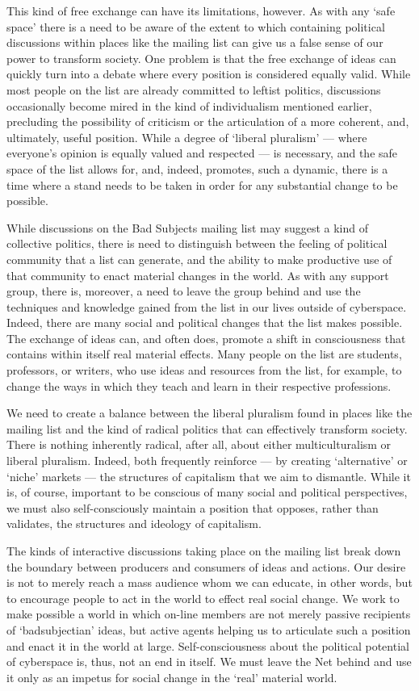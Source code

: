 \documentclass[letterpaper,12pt,english]{sphinxmanual}
\begin{document}
This kind of free exchange can have its limitations, however. As with any `safe space' there is a need to be aware of the extent to which containing political discussions within places like the mailing list can give us a false sense of our power to transform society. One problem is that the free exchange of ideas can quickly turn into a debate where every position is considered equally valid. While most people on the list are already committed to leftist politics, discussions occasionally become mired in the kind of individualism mentioned earlier, precluding the possibility of criticism or the articulation of a more coherent, and, ultimately, useful position. While a degree of `liberal pluralism' — where everyone's opinion is equally valued and respected — is necessary, and the safe space of the list allows for, and, indeed, promotes, such a dynamic, there is a time where a stand needs to be taken in order for any substantial change to be possible.

While discussions on the Bad Subjects mailing list may suggest a kind of collective politics, there is need to distinguish between the feeling of political community that a list can generate, and the ability to make productive use of that community to enact material changes in the world. As with any support group, there is, moreover, a need to leave the group behind and use the techniques and knowledge gained from the list in our lives outside of cyberspace. Indeed, there are many social and political changes that the list makes possible. The exchange of ideas can, and often does, promote a shift in consciousness that contains within itself real material effects. Many people on the list are students, professors, or writers, who use ideas and resources from the list, for example, to change the ways in which they teach and learn in their respective professions.

We need to create a balance between the liberal pluralism found in places like the mailing list and the kind of radical politics that can effectively transform society. There is nothing inherently radical, after all, about either multiculturalism or liberal pluralism. Indeed, both frequently reinforce — by creating `alternative' or `niche' markets — the structures of capitalism that we aim to dismantle. While it is, of course, important to be conscious of many social and political perspectives, we must also self-consciously maintain a position that opposes, rather than validates, the structures and ideology of capitalism.

The kinds of interactive discussions taking place on the mailing list break down the boundary between producers and consumers of ideas and actions. Our desire is not to merely reach a mass audience whom we can educate, in other words, but to encourage people to act in the world to effect real social change. We work to make possible a world in which on-line members are not merely passive recipients of `badsubjectian' ideas, but active agents helping us to articulate such a position and enact it in the world at large. Self-consciousness about the political potential of cyberspace is, thus, not an end in itself. We must leave the Net behind and use it only as an impetus for social change in the `real' material world.
\end{document}
